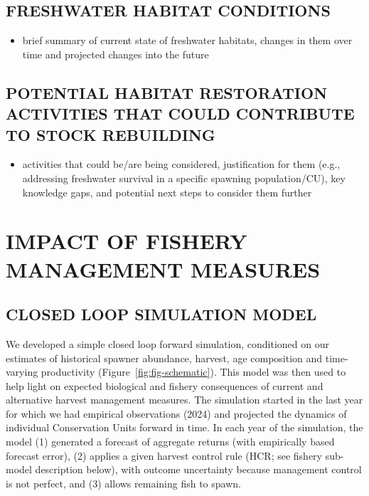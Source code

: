 \documentclass[11pt]{book}
\begin{document}
\hypertarget{freshwater-habitat-conditions}{%
\subsection{FRESHWATER HABITAT CONDITIONS}\label{freshwater-habitat-conditions}}
\begin{itemize}

\item
  brief summary of current state of freshwater habitats, changes in them over time and projected changes into the future
\end{itemize}
\hypertarget{potential-habitat-restoration-activities-that-could-contribute-to-stock-rebuilding}{%
\subsection{POTENTIAL HABITAT RESTORATION ACTIVITIES THAT COULD CONTRIBUTE TO STOCK REBUILDING}\label{potential-habitat-restoration-activities-that-could-contribute-to-stock-rebuilding}}
\begin{itemize}

\item
  activities that could be/are being considered, justification for them (e.g., addressing freshwater survival in a specific spawning population/CU), key knowledge gaps, and potential next steps to consider them further
\end{itemize}
\hypertarget{sec:impact}{%
\section{IMPACT OF FISHERY MANAGEMENT MEASURES}\label{sec:impact}}

\hypertarget{closed-loop-simulation-model}{%
\subsection{CLOSED LOOP SIMULATION MODEL}\label{closed-loop-simulation-model}}

We developed a simple closed loop forward simulation, conditioned on our estimates of historical spawner abundance, harvest, age composition and time-varying productivity (Figure~\ref{fig:fig-schematic}). This model was then used to help light on expected biological and fishery consequences of current and alternative harvest management measures. The simulation started in the last year for which we had empirical observations (2024) and projected the dynamics of individual Conservation Units forward in time. In each year of the simulation, the model (1) generated a forecast of aggregate returns (with empirically based forecast error), (2) applies a given harvest control rule (HCR; see fishery sub-model description below), with outcome uncertainty because management control is not perfect, and (3) allows remaining fish to spawn.
\end{document}
